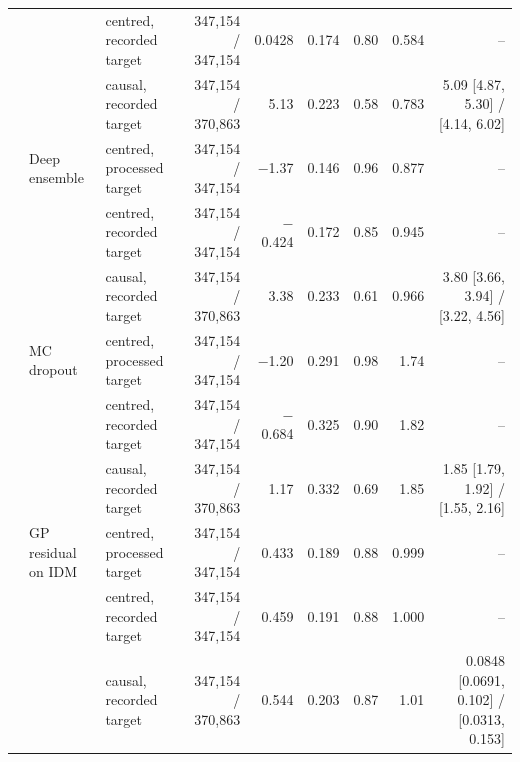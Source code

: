 \begin{longtable}{lllrrrrrr}
 &  & centred, recorded target & 347,154 / 347,154 & 0.0428 & 0.174 & 0.80 & 0.584 & -- \\
 &  & causal, recorded target & 347,154 / 370,863 & 5.13 & 0.223 & 0.58 & 0.783 & 5.09 [4.87, 5.30] / [4.14, 6.02] \\
\midrule
 & Deep ensemble & centred, processed target & 347,154 / 347,154 & $-$1.37 & 0.146 & 0.96 & 0.877 & -- \\
 &  & centred, recorded target & 347,154 / 347,154 & $-$0.424 & 0.172 & 0.85 & 0.945 & -- \\
 &  & causal, recorded target & 347,154 / 370,863 & 3.38 & 0.233 & 0.61 & 0.966 & 3.80 [3.66, 3.94] / [3.22, 4.56] \\
\midrule
 & MC dropout & centred, processed target & 347,154 / 347,154 & $-$1.20 & 0.291 & 0.98 & 1.74 & -- \\
 &  & centred, recorded target & 347,154 / 347,154 & $-$0.684 & 0.325 & 0.90 & 1.82 & -- \\
 &  & causal, recorded target & 347,154 / 370,863 & 1.17 & 0.332 & 0.69 & 1.85 & 1.85 [1.79, 1.92] / [1.55, 2.16] \\
\midrule
 & GP residual on IDM & centred, processed target & 347,154 / 347,154 & 0.433 & 0.189 & 0.88 & 0.999 & -- \\
 &  & centred, recorded target & 347,154 / 347,154 & 0.459 & 0.191 & 0.88 & 1.000 & -- \\
 &  & causal, recorded target & 347,154 / 370,863 & 0.544 & 0.203 & 0.87 & 1.01 & 0.0848 [0.0691, 0.102] / [0.0313, 0.153] \\
\end{longtable}
\endgroup
